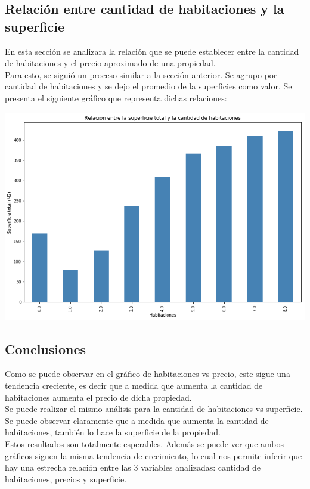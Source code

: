 \documentclass[a4paper, 10pt]{article}
\begin{document}
			\subsection{Relación entre cantidad de habitaciones y la superficie}	
				En esta sección se analizara la relación que se puede establecer entre la cantidad de habitaciones y el precio aproximado de una propiedad.				
				\\
				Para esto, se siguió un proceso similar a la sección anterior. Se agrupo por cantidad de habitaciones y se dejo el promedio de la superficies como valor. Se presenta el siguiente gráfico que representa dichas relaciones:
				
				\begin{center}    		
    				\includegraphics[width=\textwidth]{images/RelHabSup}    				
				\end{center}
			
			\subsection{Conclusiones}
				
				Como se puede observar en el gráfico de habitaciones vs precio, este sigue una tendencia creciente, es decir que a medida que aumenta la cantidad de habitaciones aumenta el precio de dicha propiedad.
				\\
				Se puede realizar el mismo análisis para la cantidad de habitaciones vs superficie. Se puede observar claramente que a medida que aumenta la cantidad de habitaciones, también lo hace la superficie de la propiedad. 
				\\
				Estos resultados son totalmente esperables. Además se puede ver que ambos gráficos siguen la misma tendencia de crecimiento, lo cual nos permite inferir que hay una estrecha relación entre las 3 variables analizadas: cantidad de habitaciones, precios y superficie.  
							
\end{document}
